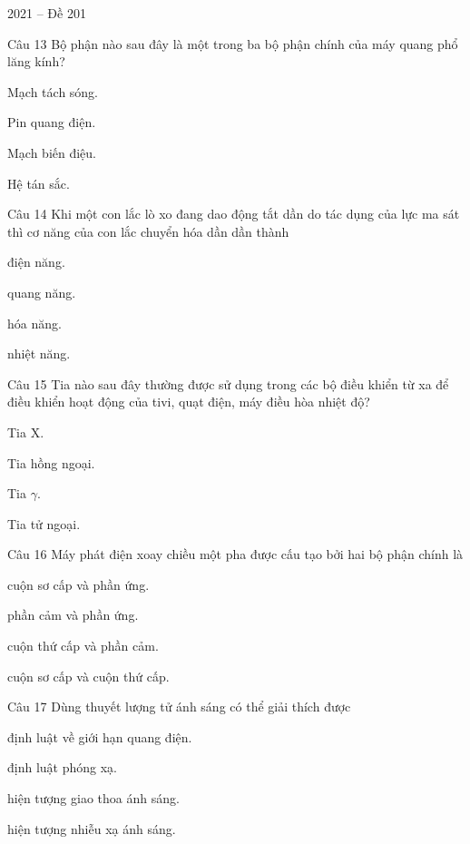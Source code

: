 \documentclass{book}
\begin{document}
\begin{quiz}{2021 – Đề 201}
\begin{multi}[points=1]{Câu 13}
 Bộ phận nào sau đây là một trong ba bộ phận chính của máy quang phổ lăng kính? 

\item  Mạch tách sóng.	
\item  Pin quang điện.	
\item  Mạch biến điệu.	
\item*  Hệ tán sắc.
\end{multi}

\begin{multi}[points=1]{Câu 14}
 Khi một con lắc lò xo đang dao động tắt dần do tác dụng của lực ma sát thì cơ năng của con lắc chuyển hóa dần dần thành

\item  điện năng.	
\item  quang năng.	
\item  hóa năng.	
\item*  nhiệt năng.
\end{multi}

\begin{multi}[points=1]{Câu 15}
 Tia nào sau đây thường được sử dụng trong các bộ điều khiển từ xa để điều khiển hoạt động của tivi, quạt điện, máy điều hòa nhiệt độ? 

\item  Tia X.	
\item*  Tia hồng ngoại.	
\item  Tia $\gamma $.	
\item  Tia tử ngoại.
\end{multi}

\begin{multi}[points=1]{Câu 16}
 Máy phát điện xoay chiều một pha được cấu tạo bởi hai bộ phận chính là 

\item  cuộn sơ cấp và phần ứng.	
\item*  phần cảm và phần ứng.	
\item  cuộn thứ cấp và phần cảm.	
\item  cuộn sơ cấp và cuộn thứ cấp.
\end{multi}

\begin{multi}[points=1]{Câu 17}
 Dùng thuyết lượng tử ánh sáng có thể giải thích được

\item*  định luật về giới hạn quang điện. 	
\item  định luật phóng xạ.	
\item  hiện tượng giao thoa ánh sáng. 	
\item  hiện tượng nhiễu xạ ánh sáng. 
\end{multi}


\end{quiz}
\end{document}
